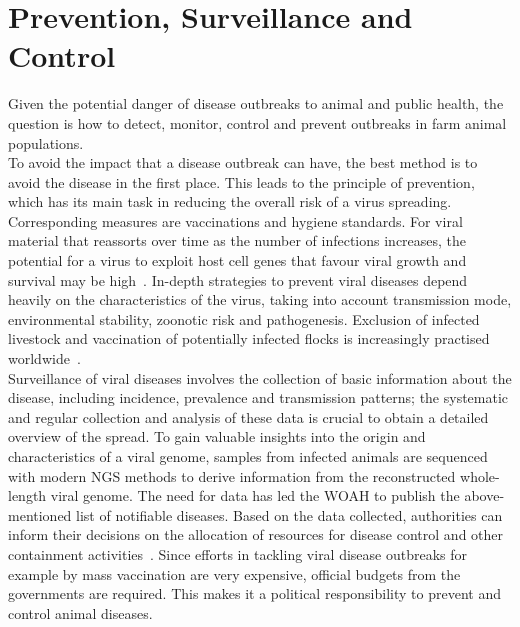 \section{Prevention, Surveillance and Control}
Given the potential danger of disease outbreaks to animal and public health, the question is how to detect, monitor, control and prevent outbreaks in farm animal populations. \\
To avoid the impact that a disease outbreak can have, the best method is to avoid the disease in the first place. This leads to the principle of prevention, which has its main task in reducing the overall risk of a virus spreading. Corresponding measures are vaccinations and hygiene standards. For viral material that reassorts over time as the number of infections increases, the potential for a virus to exploit host cell genes that favour viral growth and survival may be high~\cite{fenner2017maclachlan}. In-depth strategies to prevent viral diseases depend heavily on the characteristics of the virus, taking into account transmission mode, environmental stability, zoonotic risk and pathogenesis. Exclusion of infected livestock and vaccination of potentially infected flocks is increasingly practised worldwide~\cite{fenner2017maclachlan}. \\
Surveillance of viral diseases involves the collection of basic information about the disease, including incidence, prevalence and transmission patterns; the systematic and regular collection and analysis of these data is crucial to obtain a detailed overview of the spread. To gain valuable insights into the origin and characteristics of a viral genome, samples from infected animals are sequenced with modern \ac{NGS} methods to derive information from the reconstructed whole-length viral genome. The need for data has led the \ac{WOAH} to publish the above-mentioned list of notifiable diseases. Based on the data collected, authorities can inform their decisions on the allocation of resources for disease control and other containment activities~\cite{fenner2017maclachlan, who2017one}.
Since efforts in tackling viral disease outbreaks for example by mass vaccination are very expensive, official budgets from the governments are required. This makes it a political responsibility to prevent and control animal diseases. \\
